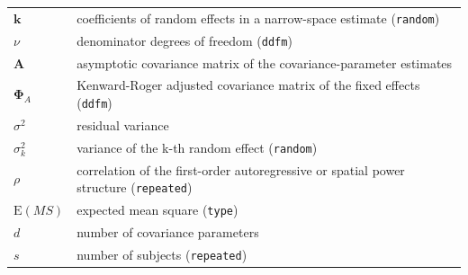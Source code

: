 \begin{longtable}{>{\raggedright\arraybackslash}p{}>{\raggedright\arraybackslash}p{}}
$\mathbf{k}$ & coefficients of random effects in a narrow-space estimate (\texttt{random})\\
$\nu$ & denominator degrees of freedom (\texttt{ddfm})\\
$\mathbf{A}$ & asymptotic covariance matrix of the covariance-parameter estimates\\
$\mathbf{\Phi}_A$ & Kenward-Roger adjusted covariance matrix of the fixed effects (\texttt{ddfm})\\
$\sigma^2$ & residual variance\\
$\sigma_k^2$ & variance of the k-th random effect (\texttt{random})\\
$\rho$ & correlation of the first-order autoregressive or spatial power structure (\texttt{repeated})\\
$\mathrm{E}(MS)$ & expected mean square (\texttt{type})\\
$d$ & number of covariance parameters\\
$s$ & number of subjects (\texttt{repeated})\\
\bottomrule
\end{longtable}
